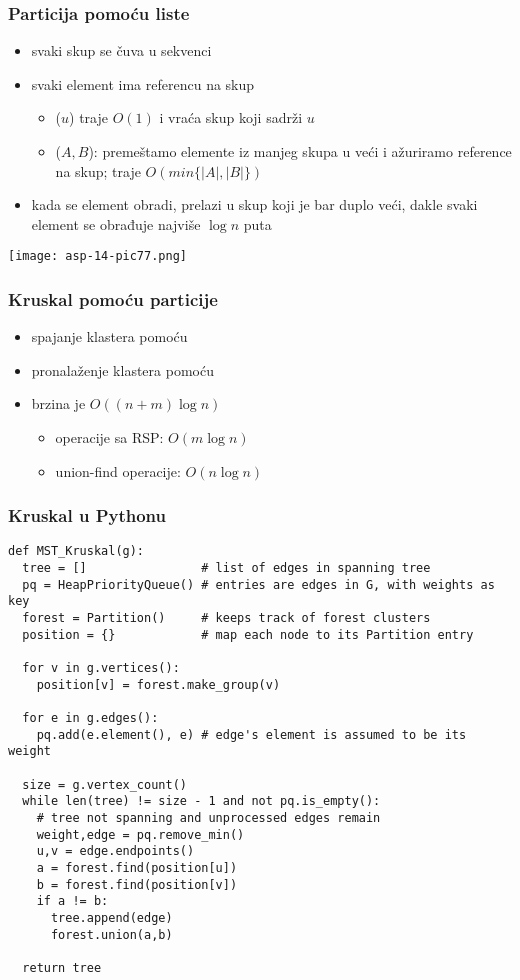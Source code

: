 \documentclass[compress,aspectratio=169]{beamer}
\begin{document}
\begin{frame}[fragile]
  \frametitle{Particija pomoću liste}
  \begin{itemize}
    \item svaki skup se čuva u sekvenci
    \item svaki element ima referencu na skup
    \begin{itemize}
      \item {}($u$) traje $O(1)$ i vraća skup koji sadrži $u$
      \item {}($A,B$): premeštamo elemente iz manjeg skupa u
        veći i ažuriramo reference na skup; traje $O(min\{|A|,|B|\})$
    \end{itemize}
    \item kada se element obradi, prelazi u skup koji je bar duplo veći,
      dakle svaki element se obrađuje najviše $\log n$ puta
  \end{itemize}
  \begin{center}
    \texttt{[image: asp-14-pic77.png]}
  \end{center}
\end{frame}

\begin{frame}[fragile]
  \frametitle{Kruskal pomoću particije}
  \begin{itemize}
    \item spajanje klastera pomoću 
    \item pronalaženje klastera pomoću 
    \item brzina je $O((n+m)\log n)$
    \begin{itemize}
      \item operacije sa RSP: $O(m\log n)$
      \item union-find operacije: $O(n\log n)$
    \end{itemize}
  \end{itemize}
\end{frame}

\begin{frame}
  \frametitle{Kruskal u Pythonu}
\begin{verbatim}
def MST_Kruskal(g):
  tree = []                # list of edges in spanning tree
  pq = HeapPriorityQueue() # entries are edges in G, with weights as key
  forest = Partition()     # keeps track of forest clusters
  position = {}            # map each node to its Partition entry

  for v in g.vertices():
    position[v] = forest.make_group(v)

  for e in g.edges():
    pq.add(e.element(), e) # edge's element is assumed to be its weight

  size = g.vertex_count()
  while len(tree) != size - 1 and not pq.is_empty():
    # tree not spanning and unprocessed edges remain
    weight,edge = pq.remove_min()
    u,v = edge.endpoints()
    a = forest.find(position[u])
    b = forest.find(position[v])
    if a != b:
      tree.append(edge)
      forest.union(a,b)

  return tree
\end{verbatim}
\end{frame}
\end{document}
